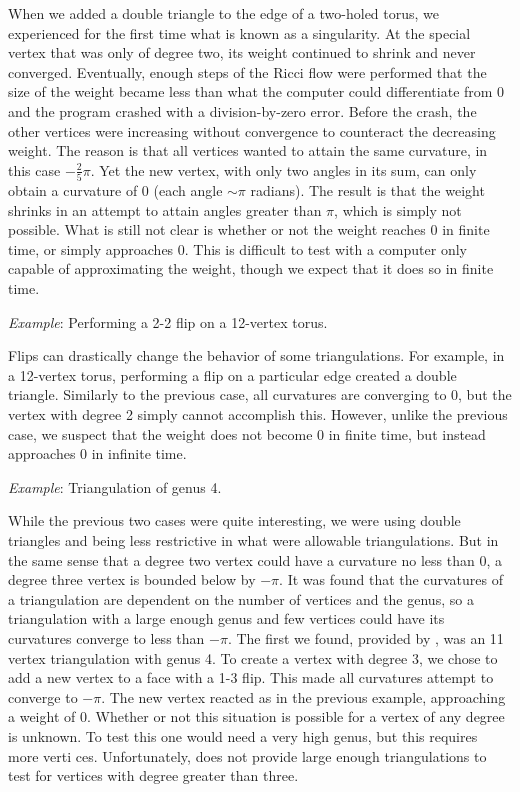 \documentclass[12pt]{article}
\begin{document}
 When we added a double triangle to the edge of a two-holed torus, we experienced for the first time what is known as a singularity. At the special vertex that was only of degree two, its weight continued to shrink and never converged. Eventually, enough steps of the Ricci flow were performed that the size of the weight became less than what the computer could differentiate from 0 and the program crashed with a division-by-zero error. Before the crash, the other vertices were increasing without convergence to counteract the decreasing weight. The reason is that all vertices wanted to attain the same curvature, in this case $-\frac{2}{5}\pi$. Yet the new vertex, with only two angles in its sum, can only obtain a curvature of 0 (each angle $\sim\pi$ radians). The result is that the weight shrinks in an attempt to attain angles greater than $\pi$, which is simply not possible. What is still not clear is whether or not the weight reaches 0 in finite time, or simply approaches 0. 
 This is difficult to test with a computer only capable of approximating the weight, though we expect that it does so in finite time.

 \textit{Example}: Performing a 2-2 flip on a 12-vertex torus. 

 Flips can drastically change the behavior of some triangulations. For example, in a 12-vertex torus, performing a flip on a particular edge created a double triangle. Similarly to the previous case, all curvatures are converging to 0, but the vertex with degree 2 simply cannot accomplish this. However, unlike the previous case, we suspect that the weight does not become 0 in finite time, but instead approaches 0 in infinite time.

 \textit{Example}: Triangulation of genus 4.

 While the previous two cases were quite interesting, we were using double triangles and being less restrictive in what were allowable triangulations. But in the same sense that a degree two vertex could have a curvature no less than 0, a degree three vertex is bounded below by $-\pi$. It was found that the curvatures of a triangulation are dependent on the number of vertices and the genus, so a triangulation with a large enough genus and few vertices could have its curvatures converge to less than $-\pi$. The first we found, provided by \cite{lutzmanifold}, was an 11 vertex triangulation with genus 4. To create a vertex with degree 3, we chose to add a new vertex to a face with a 1-3 flip. This made all curvatures attempt to converge to $-\pi$. The new vertex reacted as in the previous example, approaching a weight of 0. Whether or not this situation is possible for a vertex of any degree is unknown. To test this one would need a very high genus, but this requires more verti
 ces. Unfortunately, \cite{lutzmanifold} does not provide large enough triangulations to test for vertices with degree greater than three.
\end{document}
